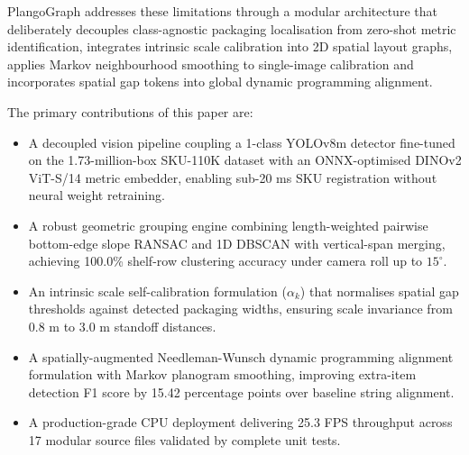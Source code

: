 \documentclass[conference]{IEEEtran}
\begin{document}
PlangoGraph addresses these limitations through a modular architecture that deliberately decouples class-agnostic packaging localisation from zero-shot metric identification, integrates intrinsic scale calibration into 2D spatial layout graphs, applies Markov neighbourhood smoothing to single-image calibration and incorporates spatial gap tokens into global dynamic programming alignment.

The primary contributions of this paper are:
\begin{itemize}
    \item A decoupled vision pipeline coupling a 1-class YOLOv8m detector fine-tuned on the 1.73-million-box SKU-110K dataset with an ONNX-optimised DINOv2 ViT-S/14 metric embedder, enabling sub-20 ms SKU registration without neural weight retraining.
    \item A robust geometric grouping engine combining length-weighted pairwise bottom-edge slope RANSAC and 1D DBSCAN with vertical-span merging, achieving 100.0\% shelf-row clustering accuracy under camera roll up to $15^\circ$.
    \item An intrinsic scale self-calibration formulation ($\alpha_k$) that normalises spatial gap thresholds against detected packaging widths, ensuring scale invariance from 0.8 m to 3.0 m standoff distances.
    \item A spatially-augmented Needleman-Wunsch dynamic programming alignment formulation with Markov planogram smoothing, improving extra-item detection F1 score by 15.42 percentage points over baseline string alignment.
    \item A production-grade CPU deployment delivering 25.3 FPS throughput across 17 modular source files validated by complete unit tests.
\end{itemize}
\end{document}
